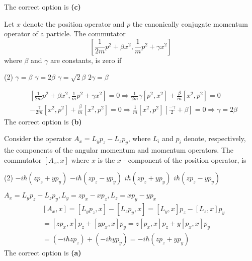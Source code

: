 \begin{enumerate}
\begin{answer}
	The correct option  is \textbf{(c)}
\end{answer}
\begin{minipage}{\textwidth}
	\item Let $x$ denote the position operator and $p$ the canonically conjugate momentum operator of a particle. The commutator
	$$
	\left[\frac{1}{2 m} p^{2}+\beta x^{2}, \frac{1}{m} p^{2}+\gamma x^{2}\right]
	$$
	where $\beta$ and $\gamma$ are constants, is zero if
\end{minipage}
\begin{tasks}(2)
	\task[\textbf{A.}] $\gamma=\beta$
	\task[\textbf{B.}]$\gamma=2 \beta$
	\task[\textbf{C.}]$\gamma=\sqrt{2} \beta$
	\task[\textbf{D.}]$2 \gamma=\beta$
\end{tasks}
\begin{answer}
	\begin{align*}
		&{\left[\frac{1}{2 m} p^{2}+\beta x^{2}, \frac{1}{m} p^{2}+\gamma x^{2}\right]=0 \Rightarrow \frac{1}{2 m} \gamma\left[p^{2}, x^{2}\right]+\frac{\beta}{m}\left[x^{2}, p^{2}\right]=0} \\
		&-\frac{\gamma}{2 m}\left[x^{2}, p^{2}\right]+\frac{\beta}{m}\left[x^{2}, p^{2}\right]=0 \Rightarrow \frac{1}{m}\left[x^{2}, p^{2}\right]\left[\frac{-\gamma}{2}+\beta\right]=0 \Rightarrow \gamma=2 \beta
	\end{align*}
	The correct option is \textbf{(b)}
\end{answer}
\begin{minipage}{\textwidth}
	\item Consider the operator $A_{x}=L_{y} p_{z}-L_{z} p_{y}$, where $L_{i}$ and $p_{i}$ denote, respectively, the components of the angular momentum and momentum operators. The commutator $\left[A_{x}, x\right]$ where $x$ is the $x$ - component of the position operator, is
\end{minipage}
\begin{tasks}(2)
	\task[\textbf{A.}] $-i \hbar\left(z p_{z}+y p_{y}\right)$
	\task[\textbf{B.}]$-i \hbar\left(z p_{z}-y p_{y}\right)$
	\task[\textbf{C.}]$i \hbar\left(z p_{z}+y p_{y}\right)$
	\task[\textbf{D.}]$i \hbar\left(z p_{z}-y p_{y}\right)$
\end{tasks}
\begin{answer}
	 $A_{x}=L_{y} p_{z}-L_{z} p_{y}, L_{y}=z p_{x}-x p_{z}, L_{z}=x p_{y}-y p_{x}$
	\begin{align*}
	&{\left[A_{x}, x\right]=\left[L_{y} p_{z}, x\right]-\left[L_{z} p_{y}, x\right]=\left[L_{y}, x\right] p_{z}-\left[L_{z}, x\right] p_{y}} \\
	&=\left[z p_{x}, x\right] p_{z}+\left[y p_{x}, x\right] p_{y}=z\left[p_{x}, x\right] p_{z}+y\left[p_{x}, x\right] p_{y} \\
	&=\left(-i \hbar z p_{z}\right)+\left(-i \hbar y p_{y}\right)=-i \hbar\left(z p_{z}+y p_{y}\right)
	\end{align*}
	The correct option is \textbf{(a)}
\end{answer}
\end{enumerate}








